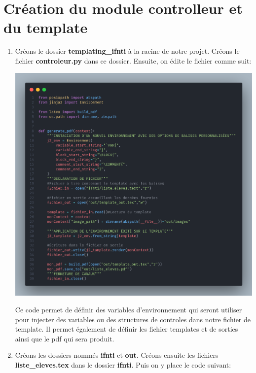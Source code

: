 \documentclass[11pt,a4paper]{article}
\begin{document}
\section{Création du module controlleur et du template}
\begin{enumerate}
\item Créons le dossier \textbf{templating\_ifnti} à la racine de notre projet. Créons le fichier \textbf{controleur.py} dans ce dossier. Ensuite, on édite le fichier comme suit:
	\begin{center}
		\includegraphics[scale=0.2]{images/code.png}
	\end{center}
Ce code permet de définir des variables d'environnement qui seront utiliser pour injecter des variables ou des structures de controles dans notre fichier de template. Il permet également de définir les fichier templates et de sorties ainsi que le pdf qui sera produit.
\item Créons les dossiers nommés \textbf{ifnti} et \textbf{out}. Créons ensuite les fichiers \textbf{liste\_eleves.tex} dans le dossier \textbf{ifnti}. Puis on y place le code suivant:
\begin{center}

\end{center}
\end{enumerate}
\end{document}
